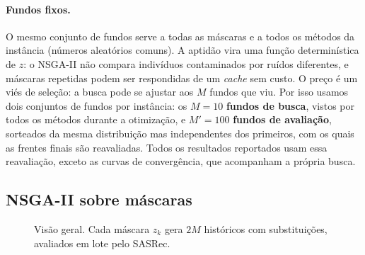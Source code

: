 \paragraph{Fundos fixos.}
O mesmo conjunto de fundos serve a todas as máscaras e a todos os métodos da
instância (números aleatórios comuns). A aptidão vira uma função
determinística de $z$: o NSGA-II não compara indivíduos contaminados por
ruídos diferentes, e máscaras repetidas podem ser respondidas de um
\emph{cache} sem custo. O preço é um viés de seleção: a busca pode se ajustar
aos $M$ fundos que viu. Por isso usamos dois conjuntos de fundos por
instância: os $M=10$ \textbf{fundos de busca}, vistos por todos os métodos
durante a otimização, e $M'=100$ \textbf{fundos de avaliação}, sorteados da
mesma distribuição mas independentes dos primeiros, com os quais as frentes
finais são reavaliadas. Todos os resultados reportados usam essa reavaliação,
exceto as curvas de convergência, que acompanham a própria busca.

\subsection{NSGA-II sobre máscaras}

\begin{figure}[t]
\centering
{}
\caption{Visão geral. Cada máscara $z_k$ gera $2M$ históricos com
substituições, avaliados em lote pelo SASRec.}
\label{fig:visao}
\end{figure}

